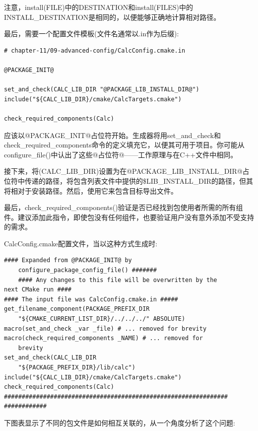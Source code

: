 注意，install(FILE)中的DESTINATION和install(FILES)中的INSTALL\_DESTINATION是相同的，以便能够正确地计算相对路径。

最后，需要一个配置文件模板(文件名通常以.in作为后缀):

\begin{lstlisting}[style=styleCMake]
# chapter-11/09-advanced-config/CalcConfig.cmake.in

@PACKAGE_INIT@

set_and_check(CALC_LIB_DIR "@PACKAGE_LIB_INSTALL_DIR@")
include("${CALC_LIB_DIR}/cmake/CalcTargets.cmake")

check_required_components(Calc)
\end{lstlisting}

应该以@PACKAGE\_INIT@占位符开始。生成器将用set\_and\_check和check\_required\_components命令的定义填充它，以便其可用于项目。你可能从configure\_file()中认出了这些@占位符@——工作原理与在C++文件中相同。

接下来，将(CALC\_LIB\_DIR)设置为在@PACKAGE\_LIB\_INSTALL\_DIR@占位符中传递的路径，将包含列表文件中提供的\$LIB\_INSTALL\_DIR的路径，但其将相对于安装路径。然后，使用它来包含目标导出文件。

最后，check\_required\_components()验证是否已经找到包使用者所需的所有组件。建议添加此指令，即使包没有任何组件，也要验证用户没有意外添加不受支持的需求。

CalcConfig.cmake配置文件，当以这种方式生成时:

\begin{lstlisting}[style=styleCMake]
#### Expanded from @PACKAGE_INIT@ by
	configure_package_config_file() #######
	#### Any changes to this file will be overwritten by the
next CMake run ####
#### The input file was CalcConfig.cmake.in #####
get_filename_component(PACKAGE_PREFIX_DIR
	"${CMAKE_CURRENT_LIST_DIR}/../../../" ABSOLUTE)
macro(set_and_check _var _file) # ... removed for brevity
macro(check_required_components _NAME) # ... removed for
	brevity
set_and_check(CALC_LIB_DIR
	"${PACKAGE_PREFIX_DIR}/lib/calc")
include("${CALC_LIB_DIR}/cmake/CalcTargets.cmake")
check_required_components(Calc)
###############################################################
############
\end{lstlisting}

下图表显示了不同的包文件是如何相互关联的，从一个角度分析了这个问题:

